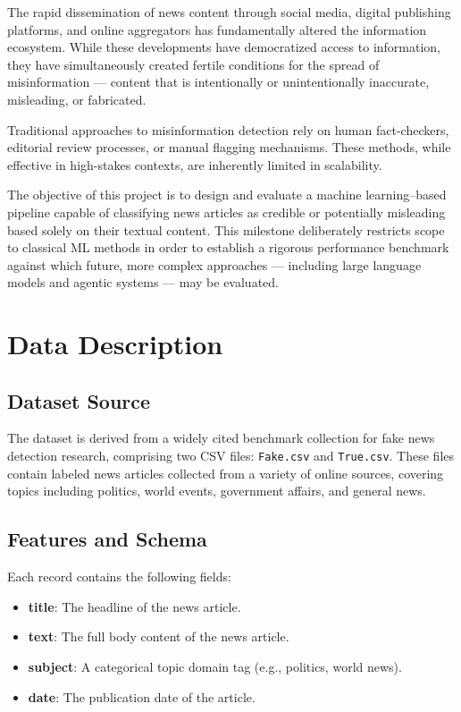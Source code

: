 \documentclass[12pt, a4paper]{article}
\begin{document}
The rapid dissemination of news content through social media, digital publishing platforms, and online aggregators has fundamentally altered the information ecosystem. While these developments have democratized access to information, they have simultaneously created fertile conditions for the spread of misinformation — content that is intentionally or unintentionally inaccurate, misleading, or fabricated.

Traditional approaches to misinformation detection rely on human fact-checkers, editorial review processes, or manual flagging mechanisms. These methods, while effective in high-stakes contexts, are inherently limited in scalability.

The objective of this project is to design and evaluate a machine learning--based pipeline capable of classifying news articles as credible or potentially misleading based solely on their textual content. This milestone deliberately restricts scope to classical ML methods in order to establish a rigorous performance benchmark against which future, more complex approaches — including large language models and agentic systems — may be evaluated.

\section{Data Description}

\subsection{Dataset Source}
The dataset is derived from a widely cited benchmark collection for fake news detection research, comprising two CSV files: \texttt{Fake.csv} and \texttt{True.csv}. These files contain labeled news articles collected from a variety of online sources, covering topics including politics, world events, government affairs, and general news.

\subsection{Features and Schema}
Each record contains the following fields:
\begin{itemize}[nosep]
    \item \textbf{title}: The headline of the news article.
    \item \textbf{text}: The full body content of the news article.
    \item \textbf{subject}: A categorical topic domain tag (e.g., politics, world news).
    \item \textbf{date}: The publication date of the article.
\end{itemize}
\end{document}
